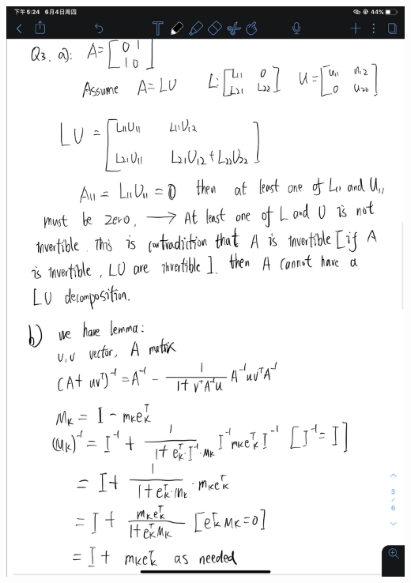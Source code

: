\documentclass[18pt]{article}
\begin{document}
    \includegraphics[scale=0.25]{IMG_0831.PNG}\\
\end{document}
